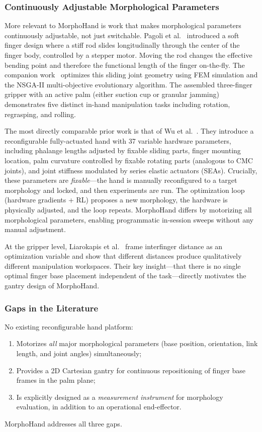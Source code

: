 \documentclass[journal]{IEEEtran}
\begin{document}
\subsubsection{Continuously Adjustable Morphological Parameters}

More relevant to MorphoHand is work that makes morphological parameters continuously
adjustable, not just switchable.
Pagoli et al.~\cite{pagoli2021softgripper} introduced a soft finger design where a stiff
rod slides longitudinally through the center of the finger body, controlled by a stepper
motor.
Moving the rod changes the effective bending point and therefore the functional length of
the finger on-the-fly.
The companion work~\cite{pagoli2020dextrous} optimizes this sliding joint geometry using
FEM simulation and the NSGA-II multi-objective evolutionary algorithm.
The assembled three-finger gripper with an active palm (either suction cup or granular
jamming) demonstrates five distinct in-hand manipulation tasks including rotation,
regrasping, and rolling.

The most directly comparable prior work is that of Wu et al.~\cite{wu2024evolving}.
They introduce a reconfigurable fully-actuated hand with 37 variable hardware parameters,
including phalange lengths adjusted by fixable sliding parts, finger mounting location,
palm curvature controlled by fixable rotating parts (analogous to CMC joints), and joint
stiffness modulated by series elastic actuators (SEAs).
Crucially, these parameters are \emph{fixable}---the hand is manually reconfigured to a
target morphology and locked, and then experiments are run.
The optimization loop (hardware gradients + RL) proposes a new morphology, the hardware
is physically adjusted, and the loop repeats.
MorphoHand differs by motorizing all morphological parameters, enabling programmatic
in-session sweeps without any manual adjustment.

At the gripper level, Liarokapis et al.~\cite{liarokapis2021reconfigurable} frame
interfinger distance as an optimization variable and show that different distances
produce qualitatively different manipulation workspaces.
Their key insight---that there is no single optimal finger base placement independent
of the task---directly motivates the gantry design of MorphoHand.

\subsubsection{Gaps in the Literature}

No existing reconfigurable hand platform:
\begin{enumerate}
  \item Motorizes \emph{all} major morphological parameters (base position, orientation,
    link length, and joint angles) simultaneously;
  \item Provides a 2D Cartesian gantry for continuous repositioning of finger base frames
    in the palm plane;
  \item Is explicitly designed as a \emph{measurement instrument} for morphology
    evaluation, in addition to an operational end-effector.
\end{enumerate}
MorphoHand addresses all three gaps.
\end{document}
